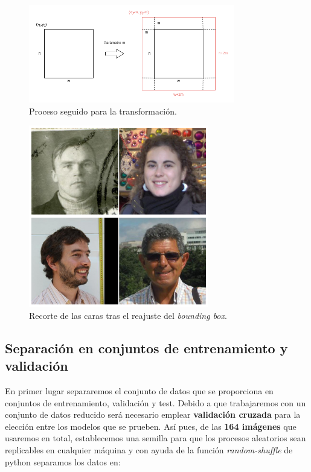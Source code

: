             \begin{figure}[!h]
                \centering
                \includegraphics[width=0.8\textwidth]{img/Transformacion_rectangulo.png}
                \caption{Proceso seguido para la transformación.}
                \label{fig:Transformacion_BB}
            \end{figure}

            \begin{figure}[!h]
                \centering
                \includegraphics[width=0.7\textwidth]{img/imagenes_ejemplo_cropping.png}
                \caption{Recorte de las caras tras el reajuste del \textit{bounding box}.}
                \label{fig:Reajuste_bb}
            \end{figure}



    \subsection{Separación en conjuntos de entrenamiento y validación}
        \noindent En primer lugar separaremos el conjunto de datos que se proporciona en conjuntos de entrenamiento, validación y test. Debido a que trabajaremos con un conjunto de datos reducido será necesario emplear \textbf{validación cruzada} para la elección entre los modelos que se prueben. Así pues, de las \textbf{164 imágenes} que usaremos en total, establecemos una semilla para que los procesos aleatorios sean replicables en cualquier máquina y con ayuda de la función \textit{random-shuffle} de python separamos los datos en: 

